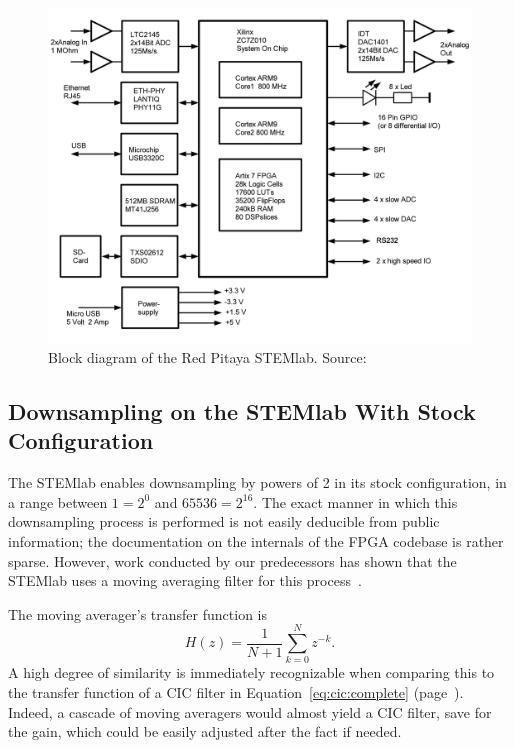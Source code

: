\begin{figure}
    \centering
    \includegraphics[width=\textwidth]{images/stl125/stemlab125.png}
    \caption[STEMlab Block Diagram]
        {Block diagram of the Red Pitaya STEMlab. Source:~\cite{pita:ossmann}}
    \label{fig:stl125:block_diagram}
\end{figure}


\subsection{Downsampling on the STEMlab With Stock Configuration} %
\label{subsec:stl125:ds_default}

The  STEMlab  enables   downsampling  by  powers  of  \num{2}   in  its  stock
configuration, in a range  between $1 = 2^0$ and $65536  = 2^{16}$.  The exact
manner in which this downsampling process is performed is not easily deducible
from  public information;  the  documentation  on the  internals  of the  FPGA
codebase  is  rather  sparse. However,  work  conducted  by  our  predecessors
has  shown  that  the  STEMlab  uses   a  moving  averaging  filter  for  this
process~\cite{bucher:kuery}.

The moving averager's transfer function is
\begin{equation}
    \label{eq:moving_averager}
    H(z) = \frac{1}{N+1}\sum_{k = 0}^{N} z^{-k}.
\end{equation}
A high degree of similarity is immediately recognizable when comparing this to
the  transfer  function  of  a CIC  filter  in  Equation~\ref{eq:cic:complete}
(page~\pageref{eq:cic:complete}). Indeed, a cascade  of moving averagers would
almost yield a CIC  filter, save for the gain, which  could be easily adjusted
after the fact if needed.

